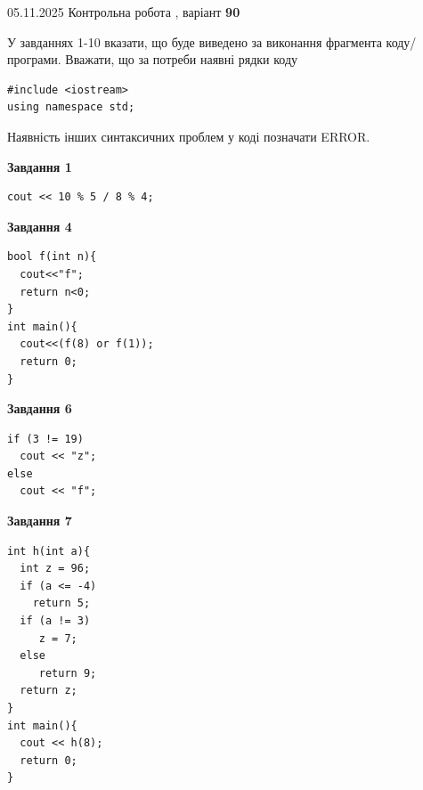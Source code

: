 \documentclass[12pt, ukrainian]{article}
\begin{document}
{\Large{05.11.2025 Контрольна робота , варіант  \No \textbf { 90 }\par}}
{
\begin {large}
У завданнях 1-10 вказати, що буде виведено за виконання фрагмента коду/про\-гра\-ми.
Вважати, що за потреби наявні рядки коду
\begin{verbatim}
#include <iostream>
using namespace std;
\end{verbatim}
Наявність інших синтаксичних проблем у коді позначати ERROR.

\begin{minipage}[t]{7.0cm}

\begin{center}
\textbf{Завдання 1}
\end{center}
\vspace{-8mm}

\begin{verbatim}
cout << 10 % 5 / 8 % 4;
\end{verbatim}



\begin{center}
\textbf{Завдання 4}
\end{center}
\vspace{-8mm}

\begin{verbatim}
bool f(int n){
  cout<<"f";
  return n<0;
}
int main(){
  cout<<(f(8) or f(1));
  return 0;
}
\end{verbatim}



\begin{center}
\textbf{Завдання 6}
\end{center}
\vspace{-8mm}

\begin{verbatim}
if (3 != 19)
  cout << "z";
else
  cout << "f";
\end{verbatim}



\begin{center}
\textbf{Завдання 7}
\end{center}
\vspace{-8mm}

\begin{verbatim}
int h(int a){
  int z = 96;
  if (a <= -4)
    return 5;
  if (a != 3)
     z = 7;
  else
     return 9;
  return z;
}
int main(){
  cout << h(8);
  return 0;
}
\end{verbatim}


\end{minipage}
\end{large}}
\end{document}

